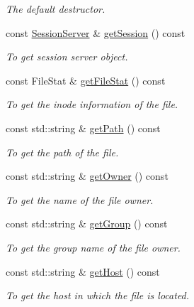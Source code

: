 \begin{DoxyCompactItemize}
\begin{DoxyCompactList}\small\item\em The default destructor. \item\end{DoxyCompactList}\item 
const \hyperlink{classSessionServer}{SessionServer} \& \hyperlink{classFile_a14e2bccf57139fadba914845580f2e46}{getSession} () const 
\begin{DoxyCompactList}\small\item\em To get session server object. \item\end{DoxyCompactList}\item 
const FileStat \& \hyperlink{classFile_aff72a878b41f2fd26ddda0d135edc69a}{getFileStat} () const 
\begin{DoxyCompactList}\small\item\em To get the inode information of the file. \item\end{DoxyCompactList}\item 
const std::string \& \hyperlink{classFile_a08ef1d4b24ca67e1c31b998cadef786a}{getPath} () const 
\begin{DoxyCompactList}\small\item\em To get the path of the file. \item\end{DoxyCompactList}\item 
const std::string \& \hyperlink{classFile_aa079a0e4cc3565d80e3c5781d71a1347}{getOwner} () const 
\begin{DoxyCompactList}\small\item\em To get the name of the file owner. \item\end{DoxyCompactList}\item 
const std::string \& \hyperlink{classFile_ae1a82572536ad97f17e0bd29523738ad}{getGroup} () const 
\begin{DoxyCompactList}\small\item\em To get the group name of the file owner. \item\end{DoxyCompactList}\item 
const std::string \& \hyperlink{classFile_a36b7d04d96fb8a3231835beccd613a9b}{getHost} () const 
\begin{DoxyCompactList}\small\item\em To get the host in which the file is located. \item\end{DoxyCompactList}\item 

\end{DoxyCompactItemize}
